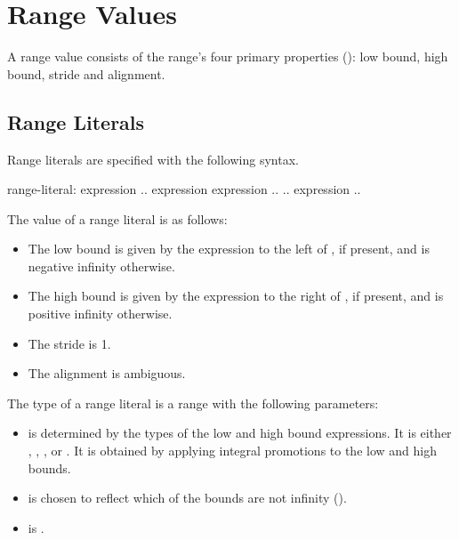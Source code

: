 \section{Range Values}
\label{Range_Values}

A range value consists of the range's four primary properties
():
low bound, high bound, stride and alignment.

\subsection{Range Literals}
\label{Range_Literals}

Range literals are specified with the following syntax.

\begin{syntax}
range-literal:
  expression .. expression
  expression ..
  .. expression
  ..
\end{syntax}

The value of a range literal is as follows:

\begin{itemize}

\item The low bound is given by the expression to the left of ,
if present, and is negative infinity otherwise.

\item The high bound is given by the expression to the right of ,
if present, and is positive infinity otherwise.

\item The stride is 1.

\item The alignment is ambiguous.

\end{itemize}

The type of a range literal is a range with the following parameters:

\begin{itemize}

\item {} is determined by the types of the
low and high bound expressions.
It is either , ,
, or .
It is obtained by
applying integral promotions to the low and high bounds.

\item {} is chosen to reflect
which of the bounds are not infinity ().

\item {} is .

\end{itemize}

